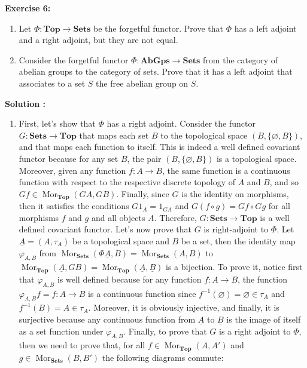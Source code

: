 \documentclass{article}
\newcommand{\CatTop}{\textbf{Top}}
\newcommand{\CatSets}{\textbf{Sets}}
\newcommand{\CatAbGps}{\textbf{AbGps}}
\DeclareMathOperator{\Mor}{Mor}
\begin{document}
\newpage

\noindent \textbf{Exercise 6:}
\begin{enumerate}[label=(\alph*)]
    \item Let $\Phi : \CatTop \to \CatSets$ be the forgetful functor. Prove that $\Phi$ has a left adjoint and a right adjoint, but they are not equal.
    \item Consider the forgetful functor $\Phi : \CatAbGps \to \CatSets$ from the category of abelian groups to the category of sets. Prove that it has a left adjoint that associates to a set $S$ the free abelian group on $S$.
\end{enumerate}

\noindent \textbf{Solution :}
\begin{enumerate}[label=(\alph*)]
    \item First, let's show that $\Phi$ has a right adjoint. Consider the functor $G : \CatSets \to \CatTop$ that maps each set $B$ to the topological space $(B, \{\varnothing, B\})$, and that maps each function to itself. This is indeed a well defined covariant functor because for any set $B$, the pair $(B, \{\varnothing, B\})$ is a topological space. Moreover, given any function $f : A \to B$, the same function is a continuous function with respect to the respective discrete topology of $A$ and $B$, and so $Gf \in \Mor_{\CatTop}(GA, GB)$. Finally, since $G$ is the identity on morphisms, then it satisfies the conditions $G1_A = 1_{GA}$ and $G(f \circ g) = Gf \circ Gg$ for all morphisms $f$ and $g$ and all objects $A$. Therefore, $G : \CatSets \to \CatTop$ is a well defined covariant functor. Let's now prove that $G$ is right-adjoint to $\Phi$. Let $\underline{A} = (A, \tau_A)$ be a topological space and $B$ be a set, then the identity map $\varphi_{A,B}$ from $\Mor_{\CatSets}(\Phi \underline{A}, B) = \Mor_{\CatSets}(A, B)$ to $\Mor_{\CatTop}(\underline{A}, GB) = \Mor_{\CatTop}(\underline{A}, \underline{B})$ is a bijection. To prove it, notice first that $\varphi_{A,B}$ is well defined because for any function $f : A \to B$, the function $\varphi_{A,B}f = f : A \to B$ is a continuous function since $f^{-1}(\varnothing) = \varnothing \in \tau_A$ and $f^{-1}(B) = A \in \tau_A$. Moreover, it is obviously injective, and finally, it is surjective because any continuous function from $\underline{A}$ to $\underline{B}$ is the image of itself as a set function under $\varphi_{A,B}$. Finally, to prove that $G$ is a right adjoint to $\Phi$, then we need to prove that, for all $f \in \Mor_{\CatTop}(A,A')$ and $g \in \Mor_{\CatSets}(B, B')$ the following diagrams commute:
    

\end{enumerate}
\end{document}
